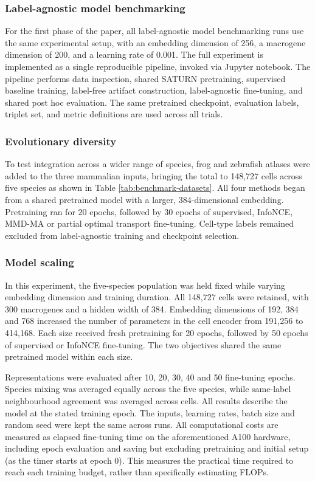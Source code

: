 \documentclass{article}
\begin{document}
\subsubsection{Label-agnostic model benchmarking}
For the first phase of the paper, all label-agnostic model benchmarking runs use the same experimental setup, with an embedding dimension of 256, a macrogene dimension of 200, and a learning rate of 0.001. The full experiment is implemented as a single reproducible pipeline, invoked via Jupyter notebook. The pipeline performs data inspection, shared SATURN pretraining, supervised baseline training, label-free artifact construction, label-agnostic fine-tuning, and shared post hoc evaluation. The same pretrained checkpoint, evaluation labels, triplet set, and metric definitions are used across all trials.
\subsubsection{Evolutionary diversity}
To test integration across a wider range of species, frog and zebrafish atlases were added to the three mammalian inputs, bringing the total to 148,727 cells across five species as shown in Table \ref{tab:benchmark-datasets}. All four methods began from a shared pretrained model with a larger, 384-dimensional embedding. Pretraining ran for 20 epochs, followed by 30 epochs of supervised, InfoNCE, MMD-MA or partial optimal transport fine-tuning. Cell-type labels remained excluded from label-agnostic training and checkpoint selection.
\subsubsection{Model scaling}
In this experiment, the five-species population was held fixed while varying embedding dimension and training duration. All 148,727 cells were retained, with 300 macrogenes and a hidden width of 384. Embedding dimensions of 192, 384 and 768 increased the number of parameters in the cell encoder from 191,256 to 414,168. Each size received fresh pretraining for 20 epochs, followed by 50 epochs of supervised or InfoNCE fine-tuning. The two objectives shared the same pretrained model within each size.

Representations were evaluated after 10, 20, 30, 40 and 50 fine-tuning epochs. Species mixing was averaged equally across the five species, while same-label neighbourhood agreement was averaged across cells. All results describe the model at the stated training epoch. The inputs, learning rates, batch size and random seed were kept the same across runs. All computational costs are measured as elapsed fine-tuning time on the aforementioned A100 hardware, including epoch evaluation and saving but excluding pretraining and initial setup (as the timer starts at epoch 0). This measures the practical time required to reach each training budget, rather than specifically estimating FLOPs.
\end{document}
